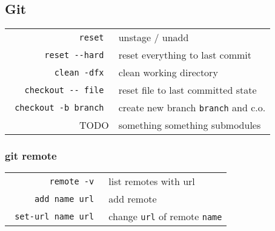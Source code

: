 \begin{multicols*}{3}
\subsection*{Git}
\begin{tabular}{@{}rl@{}}
  \verb| reset | & unstage / unadd \\
  \verb| reset --hard | & reset everything to last commit \\
  \verb| clean -dfx | & clean working directory \\
  \verb| checkout -- file | & reset file to last committed state \\
  \verb| checkout -b branch | & create new branch \verb|branch| and c.o. \\
  TODO & something something submodules
\end{tabular}
\subsubsection*{git remote}
\begin{tabular}{@{}rl@{}}
  \verb| remote -v | & list remotes with url \\
  \verb| add name url | & add remote \\
  \verb| set-url name url | & change \verb|url| of remote \verb|name|
\end{tabular}

\end{multicols*}


